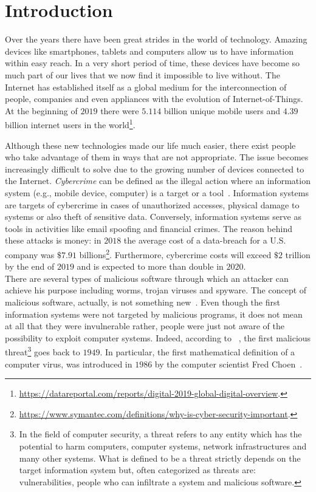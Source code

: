 \documentclass[LaM,binding=0.6cm]{sapthesis}
\begin{document}
\chapter{Introduction}
Over the years there have been great strides in the world of technology. Amazing devices like smartphones, tablets and computers allow us to have information within easy reach. In a very short period of time, these devices have become so much part of our lives that we now find it impossible to live without. The Internet has established itself as a global medium for the interconnection of people, companies and even appliances with the evolution of Internet-of-Things. At the beginning of $2019$ there were $5.114$ billion unique mobile users and $4.39$ billion internet users in the world\footnote{\url{https://datareportal.com/reports/digital-2019-global-digital-overview}.}.

Although these new technologies made our life much easier, there exist people who take advantage of them in ways that are not appropriate. The issue becomes increasingly difficult to solve due to the growing number of devices connected to the Internet. \textit{Cybercrime} can be defined as the illegal action where an information system (e.g., mobile device, computer) is a target or a tool~\cite{dashora2011cyber}. Information systems are targets of cybercrime in cases of unauthorized accesses, physical damage to systems or also theft of sensitive data. Conversely, information systems serve as tools in activities like email spoofing and financial crimes. The reason behind these attacks is money: in $2018$ the average cost of a data-breach for a U.S. company was $\$7.91$ billions\footnote{\url{https://www.symantec.com/definitions/why-is-cyber-security-important}.}. Furthermore, cybercrime costs will exceed $\$2$ trillion by the end of $2019$ and is expected to more than double in $2020$.\\

There are several types of malicious software through which an attacker can achieve his purpose including worms, trojan viruses and spyware. The concept of malicious software, actually, is not something new~\cite{Historyo87:online}. Even though the first information systems were not targeted by malicious programs, it does not mean at all that they were invulnerable rather, people were just not aware of the possibility to exploit computer systems. Indeed, according to ~\cite{Whendidt95:online}, the first malicious threat\footnote{In the field of computer security, a threat refers to any entity which has the potential to harm computers, computer systems, network infrastructures and many other systems. What is defined to be a threat strictly depends on the target information system but, often categorized as threats are: vulnerabilities, people who can infiltrate a system and malicious software.} goes back to $1949$. In particular, the first mathematical definition of a computer virus, was introduced in $1986$ by the computer scientist Fred Choen~\cite{cohen1987computer}.
\end{document}
